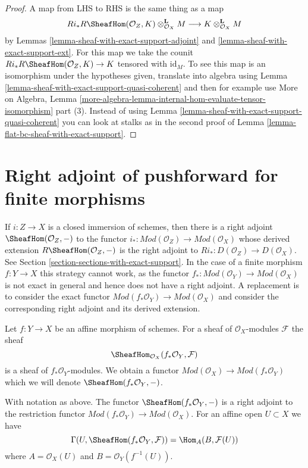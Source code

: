 \begin{proof}
A map from LHS to RHS is the same thing as a map
$$
Ri_*R\SheafHom(\mathcal{O}_Z, K) \otimes_{\mathcal{O}_X}^\mathbf{L} M
\longrightarrow
K \otimes_{\mathcal{O}_X}^\mathbf{L} M
$$
by Lemmas \ref{lemma-sheaf-with-exact-support-adjoint} and
\ref{lemma-sheaf-with-exact-support-ext}. For this map we take the
counit $Ri_*R\SheafHom(\mathcal{O}_Z, K) \to K$ tensored with $\text{id}_M$.
To see this map is an isomorphism under the hypotheses given,
translate into algebra using
Lemma \ref{lemma-sheaf-with-exact-support-quasi-coherent}
and then for example use More on Algebra, Lemma
\ref{more-algebra-lemma-internal-hom-evaluate-tensor-isomorphism} part (3).
Instead of using Lemma \ref{lemma-sheaf-with-exact-support-quasi-coherent}
you can look at stalks as in the second proof of
Lemma \ref{lemma-flat-bc-sheaf-with-exact-support}.
\end{proof}



\section{Right adjoint of pushforward for finite morphisms}
\label{section-duality-finite}

\noindent
If $i : Z \to X$ is a closed immersion of schemes, then there is
a right adjoint $\SheafHom(\mathcal{O}_Z, -)$ to the functor
$i_* : \textit{Mod}(\mathcal{O}_Z) \to \textit{Mod}(\mathcal{O}_X)$
whose derived extension $R\SheafHom(\mathcal{O}_Z, -)$
is the right adjoint to $Ri_* : D(\mathcal{O}_Z) \to D(\mathcal{O}_X)$. See
Section \ref{section-sections-with-exact-support}.
In the case of a finite morphism $f : Y \to X$ this strategy
cannot work, as the functor
$f_* : \textit{Mod}(\mathcal{O}_Y) \to \textit{Mod}(\mathcal{O}_X)$
is not exact in general and hence does not have a right adjoint.
A replacement is to consider the exact functor
$\textit{Mod}(f_*\mathcal{O}_Y) \to \textit{Mod}(\mathcal{O}_X)$
and consider the corresponding right adjoint and its derived
extension.

\medskip\noindent
Let $f : Y \to X$ be an affine morphism of schemes. For a sheaf
of $\mathcal{O}_X$-modules $\mathcal{F}$ the sheaf
$$
\SheafHom_{\mathcal{O}_X}(f_*\mathcal{O}_Y, \mathcal{F})
$$
is a sheaf of $f_*\mathcal{O}_Y$-modules. We obtain a functor
$\textit{Mod}(\mathcal{O}_X) \to \textit{Mod}(f_*\mathcal{O}_Y)$
which we will denote $\SheafHom(f_*\mathcal{O}_Y, -)$.

\begin{lemma}
\label{lemma-compute-sheafhom-affine}
With notation as above. The functor $\SheafHom(f_*\mathcal{O}_Y, -)$ is a
right adjoint to the restriction functor
$\textit{Mod}(f_*\mathcal{O}_Y) \to \textit{Mod}(\mathcal{O}_X)$.
For an affine open $U \subset X$ we have
$$
\Gamma(U, \SheafHom(f_*\mathcal{O}_Y, \mathcal{F})) =
\Hom_A(B, \mathcal{F}(U))
$$
where $A = \mathcal{O}_X(U)$ and $B = \mathcal{O}_Y(f^{-1}(U))$.
\end{lemma}

